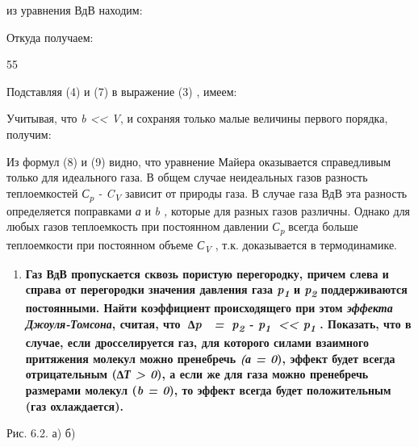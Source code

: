 из уравнения ВдВ находим:


Откуда получаем: %

55

Подставляя (4) и (7) в выражение (3) , имеем:


Учитывая, что \emph{b \textless\textless{} V}, и сохраняя только малые
величины первого порядка, получим:


Из формул (8) и (9) видно, что уравнение Майера оказывается справедливым
только для идеального газа. В общем случае неидеальных газов разность
теплоемкостей \emph{С\textsubscript{p} - C\textsubscript{V}} зависит от
природы газа. В случае газа ВдВ эта разность определяется поправками
\emph{а} и \emph{b ,} которые для разных газов различны. Однако для
любых газов теплоемкость при постоянном давлении
\emph{С\textsubscript{p}} всегда больше теплоемкости при постоянном
объеме \emph{С\textsubscript{V}} , т.к.
доказывается в термодинамике.

\begin{enumerate}
\def\labelenumi{\arabic{enumi}.}
\setcounter{enumi}{6}
\item
  \textbf{Газ ВдВ пропускается сквозь пористую перегородку, причем слева
  и справа от перегородки значения давления газа
  \emph{p\textsubscript{1}} и \emph{p\textsubscript{2}} поддерживаются
  постоянными. Найти
  коэффициент}%
  \textbf{происходящего при этом \emph{эффекта Джоуля-Томсона}, считая,
  что \emph{∆p  = p\textsubscript{2} - p\textsubscript{1}
  \textless\textless{} p\textsubscript{1}} . Показать, что в случае,
  если дросселируется газ, для которого силами взаимного притяжения
  молекул можно пренебречь \emph{(а = 0}), эффект будет всегда
  отрицательным (\emph{∆Т \textgreater{} 0}), а если же для газа можно
  пренебречь размерами молекул (\emph{b = 0}), то эффект всегда будет
  положительным (газ охлаждается).}
\end{enumerate}


Рис. 6.2. а) б)

\solving{}

